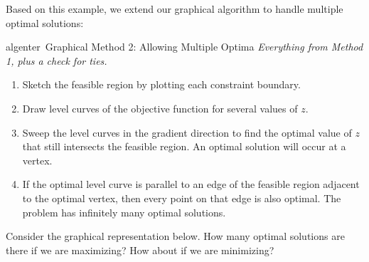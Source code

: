 Based on this example, we extend our graphical algorithm to handle multiple optimal solutions:
\begin{stepbox}{algenter}{\ Graphical Method 2: Allowing Multiple Optima}
\emph{Everything from Method 1, plus a check for ties.}
\begin{enumerate}[nosep]
\item Sketch the feasible region by plotting each constraint boundary.
\item Draw level curves of the objective function for several values of $z$.
\item Sweep the level curves in the gradient direction to find the optimal value of $z$ that still intersects the feasible region. An optimal solution will occur at a vertex.
\item If the optimal level curve is parallel to an edge of the feasible region adjacent to the optimal vertex, then every point on that edge is also optimal. The problem has infinitely many optimal solutions.
\end{enumerate}
\end{stepbox}

\begin{learningcheckpoint}[label={lc:how-many-optima}]
Consider the graphical representation below.  How many optimal solutions are there if we are maximizing?  How about if we are minimizing?
\begin{center}
\end{center}
\end{learningcheckpoint}

